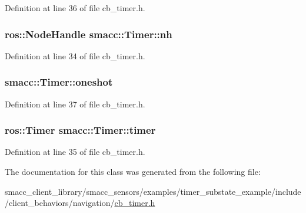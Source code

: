 Definition at line 36 of file cb\+\_\+timer.\+h.

\subsubsection[{\texorpdfstring{nh}{nh}}]{\setlength{\rightskip}{0pt plus 5cm}ros\+::\+Node\+Handle smacc\+::\+Timer\+::nh}\hypertarget{classsmacc_1_1Timer_a84b2854ae319292c9351325d98615a66}{}\label{classsmacc_1_1Timer_a84b2854ae319292c9351325d98615a66}


Definition at line 34 of file cb\+\_\+timer.\+h.

\subsubsection[{\texorpdfstring{oneshot}{oneshot}}]{ smacc\+::\+Timer\+::oneshot}\hypertarget{classsmacc_1_1Timer_a8b460b006b7173f718dfa5868c0eb59d}{}\label{classsmacc_1_1Timer_a8b460b006b7173f718dfa5868c0eb59d}


Definition at line 37 of file cb\+\_\+timer.\+h.

\subsubsection[{\texorpdfstring{timer}{timer}}]{\setlength{\rightskip}{0pt plus 5cm}ros\+::\+Timer smacc\+::\+Timer\+::timer}\hypertarget{classsmacc_1_1Timer_a1376795baefaab38614fc108aeb4f36c}{}\label{classsmacc_1_1Timer_a1376795baefaab38614fc108aeb4f36c}


Definition at line 35 of file cb\+\_\+timer.\+h.



The documentation for this class was generated from the following file\+:\begin{DoxyCompactItemize}
\item 
smacc\+\_\+client\+\_\+library/smacc\+\_\+sensors/examples/timer\+\_\+substate\+\_\+example/include/client\+\_\+behaviors/navigation/\hyperlink{cb__timer_8h}{cb\+\_\+timer.\+h}\end{DoxyCompactItemize}
